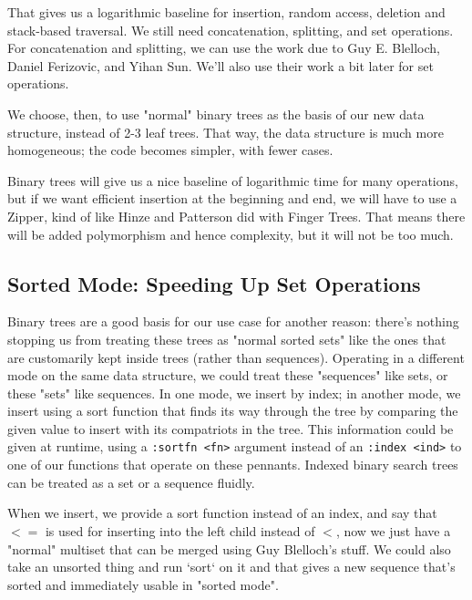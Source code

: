 \documentclass[sigconf]{acmart}
\begin{document}
That gives us a logarithmic baseline for insertion, random access, deletion and
stack-based traversal. We still need concatenation, splitting, and set
operations. For concatenation and splitting, we can use the work due to Guy E.
Blelloch, Daniel Ferizovic, and Yihan Sun\cite{10.1145/3512769}. We'll also use
their work a bit later for set operations\cite{DBLP:journals/corr/BlellochFS16}.

We choose, then, to use "normal" binary trees as the
basis of our new data structure, instead of 2-3 leaf trees. That way, the data
structure is much more homogeneous; the code becomes simpler, with fewer cases.

Binary trees will give us a nice baseline of logarithmic time for many
operations, but if we want efficient insertion at the beginning and end, we will
have to use a Zipper\cite{HUET_1997}, kind of like Hinze and
Patterson\cite{Hinze-Paterson:FingerTree} did with Finger Trees. That means
there will be added polymorphism and hence complexity, but it will not be too
much.

\subsection{Sorted Mode: Speeding Up Set Operations}

Binary trees are a good basis for our use case for another reason: there's
nothing stopping us from treating these trees as "normal sorted sets" like the
ones that are customarily kept inside trees (rather than sequences). Operating
in a different mode on the same data structure, we could treat these "sequences"
like sets, or these "sets" like sequences. In one mode, we insert by index; in
another mode, we insert using a sort function that finds its way through the
tree by comparing the given value to insert with its compatriots in the tree.
This information could be given at runtime, using a \texttt{:sortfn <fn>}
argument instead of an \texttt{:index <ind>} to one of our functions that
operate on these pennants. Indexed binary search trees can be treated as a
set or a sequence fluidly.

When we insert, we provide a sort function instead of an index, and say that
$<=$ is used for inserting into the left child instead of $<$, now we just have
a "normal" multiset that can be merged using Guy Blelloch's stuff. We could
also take an unsorted thing and run `sort` on it and that gives a new sequence
that's sorted and immediately usable in "sorted mode".
\end{document}
